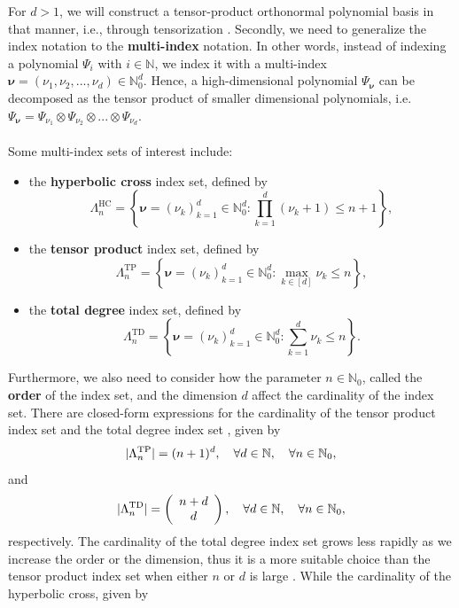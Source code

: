 \documentclass[12pt, oneside]{report}   	%
\newcommand{\N}{\mathbb{N}}
\DeclarePairedDelimiter{\abs}{\lvert}{\rvert}
\begin{document}
\noindent For $d>1$, we will construct a tensor-product orthonormal polynomial basis in that manner, i.e., through tensorization \cite{sparsepoly}. Secondly, we need to generalize the index notation to the \textbf{multi-index} notation. In other words, instead of indexing a polynomial $\Psi_i$ with $i\in\N$, we index it with a multi-index $\boldsymbol{\nu}=(\nu_1,\nu_2,...,\nu_d)\in\N_0^d$. Hence, a high-dimensional polynomial $\Psi_{\boldsymbol{\nu}}$ can be decomposed as the tensor product of smaller dimensional polynomials, i.e. $\Psi_{\boldsymbol{\nu}}=\Psi_{\nu_1}\otimes\Psi_{\nu_2}\otimes...\otimes\Psi_{\nu_d}$.\\\\ 
Some multi-index sets of interest include:
\begin{itemize}
    \item the \textbf{hyperbolic cross} index set, defined by
    $$
    \Lambda_n^{\mathrm{HC}}=\left\{\boldsymbol{\nu}=\left(\nu_k\right)_{k=1}^d \in \mathbb{N}_0^d: \prod_{k=1}^d\left(\nu_k+1\right) \leq n+1\right\},
    $$
    \item the \textbf{tensor product} index set, defined by
    $$
    \Lambda_n^{\mathrm{TP}}=\left\{\boldsymbol{\nu}=\left(\nu_k\right)_{k=1}^d \in \mathbb{N}_0^d: \max _{k \in[d]} \nu_k \leq n\right\},
    $$
    \item the \textbf{total degree} index set, defined by
    $$
    \Lambda_n^{\mathrm{TD}}=\left\{\boldsymbol{\nu}=\left(\nu_k\right)_{k=1}^d \in \mathbb{N}_0^d: \sum_{k=1}^d \nu_k \leq n\right\}.
    $$
\end{itemize}
Furthermore, we also need to consider how the parameter $n\in\N_0$, called the \textbf{order} of the index set, and the dimension $d$ affect the cardinality of the index set. There are closed-form expressions for the cardinality of the tensor product index set and the total degree index set \cite{sparsepoly}, given by
$$
\abs{\Lambda_n^{\mathrm{TP}}}=(n+1)^d, \quad \forall d \in \N, \quad \forall n \in \N_0,
$$
and
$$
\abs{\Lambda_n^{\mathrm{TD}}}=\left(\begin{array}{c}
n+d \\
d
\end{array}\right), \quad \forall d \in \N, \quad \forall n \in \N_0,
$$
respectively. The cardinality of the total degree index set grows less rapidly as we increase the order or the dimension, thus it is a more suitable choice than the tensor product index set when either $n$ or $d$ is large \cite{sparsepoly}. While the cardinality of the hyperbolic cross, given by
\end{document}

